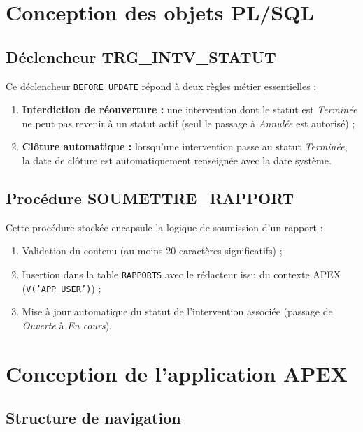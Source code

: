 \documentclass[12pt,a4paper,oneside]{report}
\begin{document}
\section{Conception des objets PL/SQL}

\subsection{Déclencheur TRG\_INTV\_STATUT}

Ce déclencheur \texttt{BEFORE UPDATE} répond à deux règles métier essentielles :

\begin{enumerate}[leftmargin=2em]
  \item \textbf{Interdiction de réouverture :} une intervention dont le statut est \textit{Terminée} ne peut pas revenir à un statut actif (seul le passage à \textit{Annulée} est autorisé) ;
  \item \textbf{Clôture automatique :} lorsqu'une intervention passe au statut \textit{Terminée}, la date de clôture est automatiquement renseignée avec la date système.
\end{enumerate}

\subsection{Procédure SOUMETTRE\_RAPPORT}

Cette procédure stockée encapsule la logique de soumission d'un rapport :

\begin{enumerate}[leftmargin=2em]
  \item Validation du contenu (au moins 20 caractères significatifs) ;
  \item Insertion dans la table \texttt{RAPPORTS} avec le rédacteur issu du contexte APEX (\texttt{V('APP\_USER')}) ;
  \item Mise à jour automatique du statut de l'intervention associée (passage de \textit{Ouverte} à \textit{En cours}).
\end{enumerate}

\section{Conception de l'application APEX}

\subsection{Structure de navigation}
\end{document}

